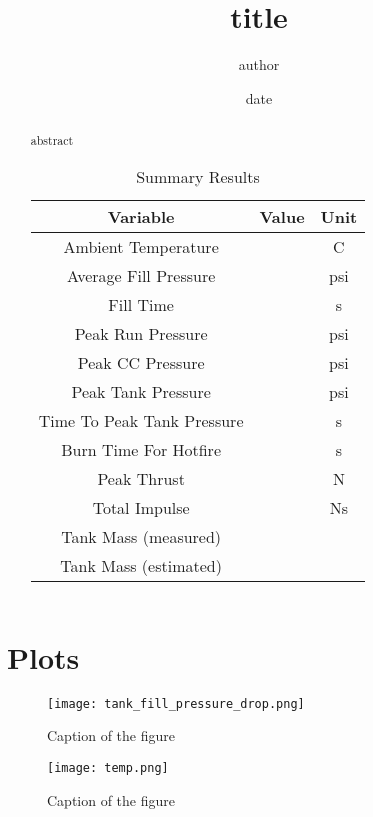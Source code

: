 \documentclass[letterpaper,12pt]{article}
\begin{document}
\title{{{ title }}}
\author{{{ author }}}
\date{{{ date }}}
\maketitle

\begin{abstract}
{{ abstract }}

\begin{table}[H]
\begin{center}
\caption{Summary Results}
\label{tbl:issues}
\begin{tabular}{|c|c|c|}
\hline
\textbf{Variable} & \textbf{Value} & \textbf{Unit} \\
\hline
Ambient Temperature &  & C \\
\hline
Average Fill Pressure &  & psi \\
\hline
Fill Time &  & s \\
\hline
Peak Run Pressure &  & psi \\
\hline
Peak CC Pressure &  & psi \\
\hline
Peak Tank Pressure &  & psi \\
\hline
Time To Peak Tank Pressure &  & s \\
\hline
Burn Time For Hotfire &  & s \\
\hline
Peak Thrust &  & N \\
\hline
Total Impulse &  & Ns \\
\hline
Tank Mass (measured) &  &  \\
\hline
Tank Mass (estimated) &  &  \\
\hline
\end{tabular}
\end{center}
\end{table}

\end{abstract}

\section{Plots}

\begin{figure}[H]
    \centering
    \texttt{[image: tank\_fill\_pressure\_drop.png]}
    \caption{Caption of the figure}
    \label{fig:labelname}
\end{figure}

\begin{figure}[H]
    \centering
    \texttt{[image: temp.png]}
    \caption{Caption of the figure}
    \label{fig:labelname}
\end{figure}
\end{document}
